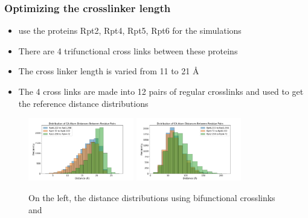\documentclass[a4paper,8pt]{beamer}
\begin{document}
%
%
%
\begin{frame}
\frametitle{Optimizing the crosslinker length}
\begin{block}{}
\begin{itemize}
  \item use the proteins Rpt2, Rpt4, Rpt5, Rpt6 for the simulations
  \item There are 4 trifunctional cross links between these proteins
  \item The cross linker length is varied from 11 to 21 {\AA}
  \item The 4 cross links are made into 12 pairs of regular crosslinks and used to get the reference distance distributions
\end{itemize}
\end{block}
\begin{figure}
\centering
\includegraphics[width=0.41\textwidth]{test-figures/only-bi.pdf}
\includegraphics[width=0.41\textwidth]{test-figures/only-tri.pdf}
\caption{On the left, the distance distributions using bifunctional crosslinks and 
}
\end{figure}
\end{frame}
\end{document}
